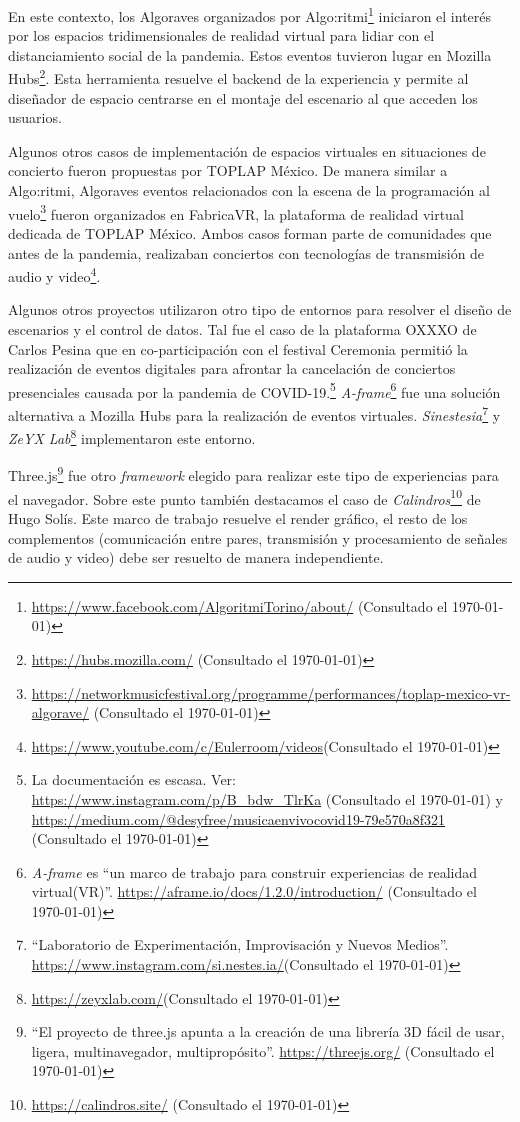 En este contexto, los Algoraves organizados por Algo:ritmi\footnote{\url{https://www.facebook.com/AlgoritmiTorino/about/} (Consultado el \today)} iniciaron el interés por los espacios tridimensionales de realidad virtual para lidiar con el distanciamiento social de la pandemia. Estos eventos tuvieron lugar en Mozilla Hubs\footnote{\url{https://hubs.mozilla.com/} (Consultado el \today)}. Esta herramienta resuelve el backend de la experiencia y permite al diseñador de espacio centrarse en el montaje del escenario al que acceden los usuarios.

Algunos otros casos de implementación de espacios virtuales en situaciones de concierto fueron propuestas por TOPLAP México. De manera similar a Algo:ritmi, Algoraves eventos relacionados con la escena de la programación al vuelo\footnote{\url{https://networkmusicfestival.org/programme/performances/toplap-mexico-vr-algorave/} (Consultado el \today)} fueron organizados en FabricaVR, la plataforma de realidad virtual dedicada de TOPLAP México. Ambos casos forman parte de comunidades que antes de la pandemia, realizaban conciertos con tecnologías de transmisión de audio y video\footnote{\url{https://www.youtube.com/c/Eulerroom/videos}(Consultado el \today)}.%

Algunos otros proyectos utilizaron otro tipo de entornos para resolver el diseño de escenarios y el control de datos. Tal fue el caso de la plataforma OXXXO de Carlos Pesina que en co-participación con el festival Ceremonia permitió la realización de eventos digitales para afrontar la cancelación de conciertos presenciales causada por la pandemia de COVID-19.\footnote{La documentación es escasa. Ver: \url{https://www.instagram.com/p/B_bdw_TlrKa} (Consultado el \today) y \url{https://medium.com/@desyfree/musicaenvivocovid19-79e570a8f321} (Consultado el \today)} \textit{A-frame}\footnote{\textit{A-frame} es ``un marco de trabajo para construir experiencias de realidad virtual(VR)''. \url{https://aframe.io/docs/1.2.0/introduction/} (Consultado el \today)} fue una solución alternativa a Mozilla Hubs para la realización de eventos virtuales. \textit{Sinestesia}\footnote{``Laboratorio de Experimentación, Improvisación y Nuevos Medios''. \url{https://www.instagram.com/si.nestes.ia/}(Consultado el \today)} y \textit{ZeYX Lab}\footnote{\url{https://zeyxlab.com/}(Consultado el \today)} implementaron este entorno.

Three.js\footnote{``El proyecto de three.js apunta a la creación de una librería 3D fácil de usar, ligera, multinavegador, multipropósito''. \url{https://threejs.org/} (Consultado el \today)} fue otro \textit{framework} elegido para realizar este tipo de experiencias para el navegador. Sobre este punto también destacamos el caso de \textit{Calindros}\footnote{\url{https://calindros.site/} (Consultado el \today)} de Hugo Solís. Este marco de trabajo resuelve el render gráfico, el resto de los complementos (comunicación entre pares, transmisión y procesamiento de señales de audio y video) debe ser resuelto de manera independiente. %

